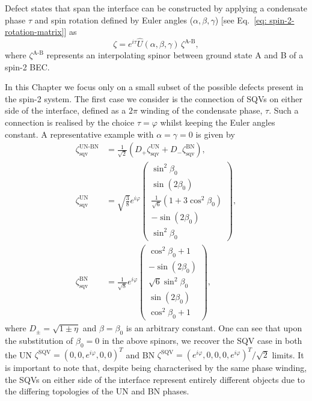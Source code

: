 Defect states that span the interface can be constructed by applying a
condensate phase \(\tau \) and spin rotation defined by
Euler angles (\(\alpha, \beta, \gamma \))
[see Eq.~\eqref{eq: spin-2-rotation-matrix}] as
\begin{equation}\label{eq: spin-rotation-action}
    \zeta = e^{i\tau}\hat{U}(\alpha, \beta, \gamma)\,\zeta^\text{A-B},
\end{equation}
where \(\zeta^\text{A-B}\) represents an interpolating spinor between ground
state A and B of a spin-2 BEC\@.

In this Chapter we focus only on a small subset of the possible defects present
in the spin-2 system.
The first case we consider is the connection of SQVs on either side of the
interface, defined as a \(2\pi \) winding of the condensate phase, \(\tau \).
Such a connection is realised by the choice \(\tau = \varphi \) whilst keeping
the Euler angles constant.
A representative example with \(\alpha = \gamma = 0\) is given by
\begin{align}\label{eq: UN-BN-SQV-SQV}
    \zeta_\text{sqv}^\text{UN-BN} & =
    \frac{1}{\sqrt{2}}\left( D_+\zeta^\text{UN}_\text{sqv}
    + D_-\zeta^\text{BN}_\text{sqv}\right),                       \\
    \zeta^\text{UN}_\text{sqv}    & =
    \sqrt{\frac38}e^{i\varphi}
    \begin{pmatrix}
        \sin^2\beta_0                                   \\
        \sin (2 \beta _0)                               \\
        \frac{1}{\sqrt{6}}\left(1+3\cos^2\beta_0\right) \\
        - \sin (2 \beta _0)                             \\
        \sin^2\beta_0
    \end{pmatrix}, \\
    \zeta^\text{BN}_\text{sqv}    & =
    \frac{1}{\sqrt{8}}e^{i\varphi}
    \begin{pmatrix}
        \cos^2\beta_0 + 1     \\
        - \sin (2 \beta _0)   \\
        \sqrt{6}\sin^2\beta_0 \\
        \sin (2 \beta _0)     \\
        \cos^2\beta_0 + 1
    \end{pmatrix},
\end{align}
where \(D_{\pm} = \sqrt{1 \pm \eta}\) and \(\beta=\beta_0\) is an arbitrary
constant.
One can see that upon the substitution of \(\beta_0 = 0\) in the above spinors,
we recover the SQV case in both the UN
\(\zeta^\mathrm{SQV} = {(0,0,e^{i\varphi},0,0)}^T\) and BN
\(\zeta^\mathrm{SQV} = {(e^{i\varphi},0,0,0,e^{i\varphi})}^T/\sqrt{2}\) limits.
It is important to note that, despite being characterised by the same phase
winding, the SQVs on either side of the interface represent entirely different
objects due to the differing topologies of the UN and BN phases.

